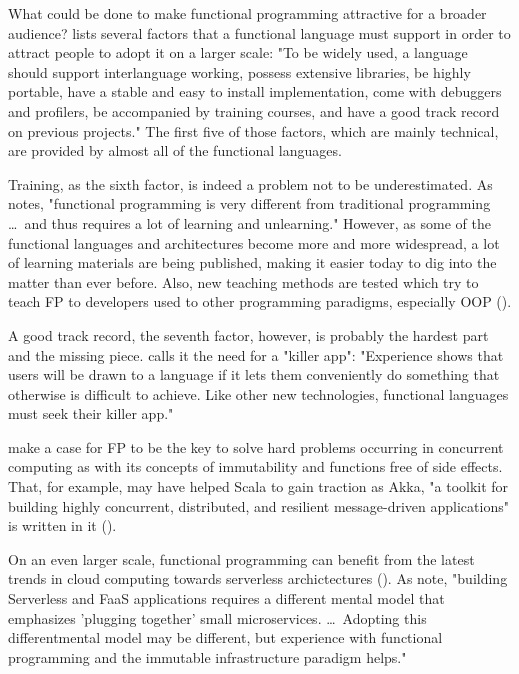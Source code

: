 What could be done to make functional programming attractive for a broader audience? \cite[23]{wadler_why_1998} lists several factors that a functional language must support in order to attract people to adopt it on a larger scale: "To be widely used, a language should support interlanguage working, possess extensive libraries, be highly portable, have a stable and easy to install implementation, come with debuggers and profilers, be accompanied by training courses, and have a good track record on previous projects." The first five of those factors, which are mainly technical, are provided by almost all of the functional languages. 

Training, as the sixth factor, is indeed a problem not to be underestimated. As \cite[86]{hinsen_promises_2009} notes, "functional programming is very different from traditional programming \dots\ and thus requires a lot of learning and unlearning." However, as some of the functional languages and architectures become more and more widespread, a lot of learning materials are being published, making it easier today to dig into the matter than ever before. Also, new teaching methods are tested which try to teach FP to developers used to other programming paradigms, especially OOP (\cite{petricek_teaching_2012}).

A good track record, the seventh factor, however, is probably the hardest part and the missing piece. \cite[26]{wadler_why_1998} calls it the need for a "killer app": "Experience shows that users will be drawn to a language if it lets them conveniently do something that otherwise is difficult to achieve. Like other new technologies, functional languages must seek their killer app."

\cite{wampler_guest_2010} make a case for FP to be the key to solve hard problems occurring in concurrent computing as with its concepts of immutability and functions free of side effects. That, for example, may have helped Scala to gain traction as Akka, "a toolkit for building highly concurrent, distributed, and resilient message-driven applications" is written in it (\cite{lightbend_akka:_2019}). 

On an even larger scale, functional programming can benefit from the latest trends in cloud computing towards serverless archictectures (\cite{lynn_preliminary_2017}). As \cite{leitner_mixed-method_2019} note, "building Serverless and FaaS applications requires a different mental model that emphasizes 'plugging together' small microservices. \dots\ Adopting this differentmental model may be different, but experience with functional programming and the immutable infrastructure paradigm helps."

